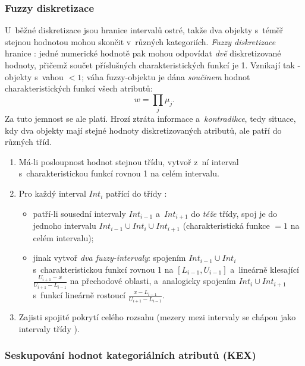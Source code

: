 \documentclass[11pt,a4paper]{article}
\theoremstyle{definition}
\begin{document}
\subsubsection{Fuzzy diskretizace}

U~běžné diskretizace jsou hranice intervalů ostré, takže dva objekty s~téměř stejnou hodnotou
mohou skončit v~různých kategoriích. \emph{Fuzzy diskretizace} hranice : jedné
numerické hodnotě pak mohou odpovídat \emph{dvě} diskretizované hodnoty, přičemž součet
příslušných charakteristických funkcí je 1. Vznikají tak -objekty s~vahou $<1$; váha
fuzzy-objektu je dána \emph{součinem} hodnot charakteristických funkcí všech atributů:
\[ w = \prod_j \mu_j. \]
Za tuto jemnost se ale platí. Hrozí ztráta informace a~\emph{kontradikce}, tedy situace, kdy
dva objekty mají stejné hodnoty diskretizovaných atributů, ale patří do různých tříd.

\begin{defbox}
\begin{enumerate}
\item Má-li posloupnost hodnot stejnou třídu, vytvoř z~ní interval s~charakteristickou
      funkcí rovnou 1 na celém intervalu.
\item Pro každý interval $\mathit{Int}_i$ patřící do třídy :
      \begin{itemize}
      \item patří-li sousední intervaly $\mathit{Int}_{i-1}$ a~$\mathit{Int}_{i+1}$ do
            \emph{téže} třídy, spoj je do jednoho intervalu
            $\mathit{Int}_{i-1}\cup \mathit{Int}_i\cup \mathit{Int}_{i+1}$
            (charakteristická funkce $=1$ na celém intervalu);
      \item jinak vytvoř \emph{dva fuzzy-intervaly}: spojením $\mathit{Int}_{i-1}\cup
            \mathit{Int}_i$ s~charakteristickou funkcí rovnou 1 na
            $[L_{i-1},U_{i-1}]$ a~lineárně klesající
            $\frac{U_{i+1}-x}{U_{i+1}-L_{i-1}}$ na přechodové oblasti, a~analogicky
            spojením $\mathit{Int}_i\cup \mathit{Int}_{i+1}$ s~funkcí lineárně rostoucí
            $\frac{x-L_{i-1}}{U_{i+1}-L_{i-1}}$.
      \end{itemize}
\item Zajisti spojité pokrytí celého rozsahu (mezery mezi intervaly se chápou jako
      intervaly třídy ).
\end{enumerate}
\end{defbox}

\subsubsection{Seskupování hodnot kategoriálních atributů (KEX)}
\end{document}
